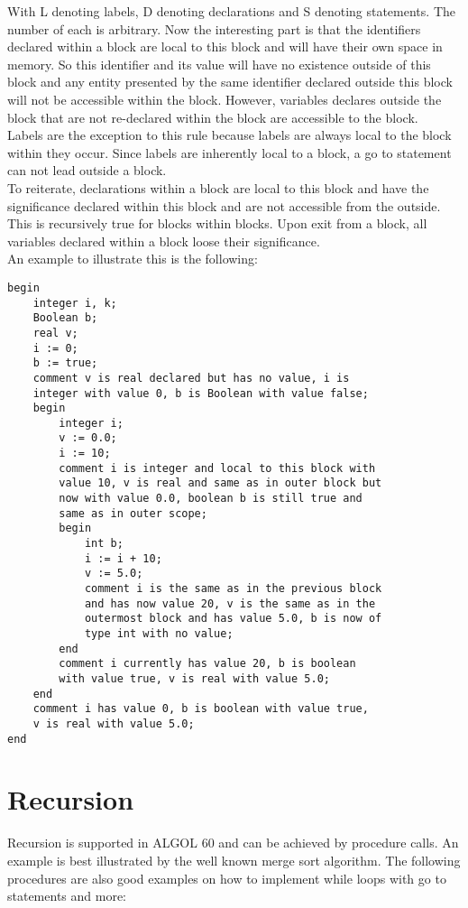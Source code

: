 \documentclass{article}
\begin{document}
With L denoting labels, D denoting declarations and S denoting statements. The number of each is arbitrary. Now the interesting part is that the identifiers declared within a block are local to this block and will have their own space in memory. So this identifier and its value will have no existence outside of this block and any entity presented by the same identifier declared outside this block will not be accessible within the block. However, variables declares outside the block that are not re-declared within the block are accessible to the block. \\

Labels are the exception to this rule because labels are always local to the block within they occur. Since labels are inherently local to a block, a go to statement can not lead outside a block.\\

To reiterate, declarations within a block are local to this block and have the significance declared within this block and are not accessible from the outside. This is recursively true for blocks within blocks. Upon exit from a block, all variables declared within a block loose their significance.\\

An example to illustrate this is the following:

\begin{lstlisting}[language={[60]algol}]
begin
    integer i, k;
    Boolean b;
    real v;
    i := 0;
    b := true;
    comment v is real declared but has no value, i is 
    integer with value 0, b is Boolean with value false;
    begin
        integer i;
        v := 0.0;
        i := 10;
        comment i is integer and local to this block with 
        value 10, v is real and same as in outer block but 
        now with value 0.0, boolean b is still true and 
        same as in outer scope;
        begin
            int b;
            i := i + 10;
            v := 5.0;
            comment i is the same as in the previous block 
            and has now value 20, v is the same as in the 
            outermost block and has value 5.0, b is now of 
            type int with no value;
        end
        comment i currently has value 20, b is boolean 
        with value true, v is real with value 5.0;
    end
    comment i has value 0, b is boolean with value true, 
    v is real with value 5.0;
end
\end{lstlisting}

\newpage

\section{Recursion}
Recursion is supported in ALGOL 60 and can be achieved by procedure calls. An example is best illustrated by the well known merge sort algorithm. The following procedures are also good examples on how to implement while loops with go to statements and more:
\end{document}
